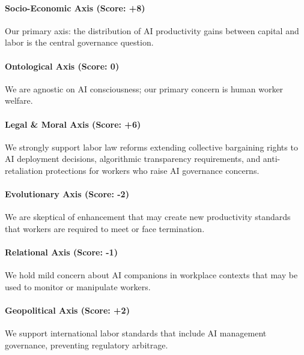 \paragraph{Socio-Economic Axis (Score:
+8)}\label{socio-economic-axis-score-8-2}

Our primary axis: the distribution of AI productivity gains between
capital and labor is the central governance question.

\paragraph{Ontological Axis (Score:
0)}\label{ontological-axis-score-0-15}

We are agnostic on AI consciousness; our primary concern is human worker
welfare.

\paragraph{Legal \& Moral Axis (Score:
+6)}\label{legal-moral-axis-score-6-3}

We strongly support labor law reforms extending collective bargaining
rights to AI deployment decisions, algorithmic transparency
requirements, and anti-retaliation protections for workers who raise AI
governance concerns.

\paragraph{Evolutionary Axis (Score:
-2)}\label{evolutionary-axis-score--2-5}

We are skeptical of enhancement that may create new productivity
standards that workers are required to meet or face termination.

\paragraph{Relational Axis (Score:
-1)}\label{relational-axis-score--1-5}

We hold mild concern about AI companions in workplace contexts that may
be used to monitor or manipulate workers.

\paragraph{Geopolitical Axis (Score:
+2)}\label{geopolitical-axis-score-2-7}

We support international labor standards that include AI management
governance, preventing regulatory arbitrage.

